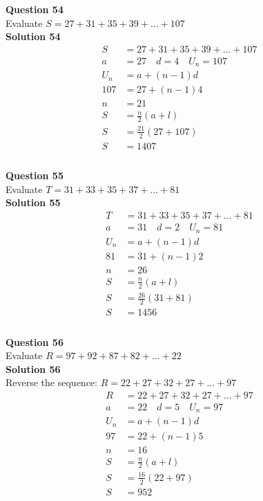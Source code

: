 \documentclass{article}
\begin{document}
\noindent\textbf{Question 54}\\[5pt]
Evaluate $S=27+31+35+39+...+107$\\[5pt]
\noindent\textbf{Solution 54}\\[5pt]
\begin{align*}
S&=27+31+35+39+...+107\\[2pt]
a&=27\quad d=4 \quad U_n=107\\[2pt]
U_n&=a+(n-1)d\\[2pt]
107&=27+(n-1)4\\[2pt]
n&=21\\[12pt]
S&=\displaystyle\frac{n}{2}(a+l)\\[2pt]
S&=\displaystyle\frac{21}{2}(27+107)\\[2pt]
S&=1407\\[-140pt]
\end{align*}\\[10pt]

\noindent\textbf{Question 55}\\[5pt]
Evaluate $T=31+33+35+37+...+81$\\[5pt]
\noindent\textbf{Solution 55}\\[5pt]
\begin{align*}
T&=31+33+35+37+...+81\\[2pt]
a&=31\quad d=2 \quad U_n=81\\[2pt]
U_n&=a+(n-1)d\\[2pt]
81&=31+(n-1)2\\[2pt]
n&=26\\[12pt]
S&=\displaystyle\frac{n}{2}(a+l)\\[2pt]
S&=\displaystyle\frac{26}{2}(31+81)\\[2pt]
S&=1456\\[-140pt]
\end{align*}\\[10pt]

\noindent\textbf{Question 56}\\[5pt]
Evaluate $R=97+92+87+82+...+22$\\[5pt]
\noindent\textbf{Solution 56}\\[5pt]
Reverse the sequence: $R=22+27+32+27+...+97$
\begin{align*}
R&=22+27+32+27+...+97\\[2pt]
a&=22\quad d=5 \quad U_n=97\\[2pt]
U_n&=a+(n-1)d\\[2pt]
97&=22+(n-1)5\\[2pt]
n&=16\\[12pt]
S&=\displaystyle\frac{n}{2}(a+l)\\[2pt]
S&=\displaystyle\frac{16}{2}(22+97)\\[2pt]
S&=952\\
\end{align*}\\[10pt]
\end{document}
